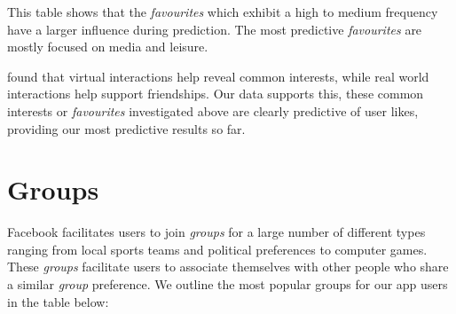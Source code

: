 This table shows that the \emph{favourites} which exhibit a high to medium frequency have a larger influence during prediction. The most 
predictive \emph{favourites} are mostly focused on media and leisure.

\cite{brandtzag2011facebook} found that virtual interactions help reveal common interests, while real world interactions help 
support friendships. Our data supports this, these common interests or \emph{favourites} investigated above are clearly predictive 
of user likes, providing our most predictive results so far.


\section{Groups}
\label{sec:groups}

Facebook facilitates users to join \emph{groups} for a large number of different types ranging from 
local sports teams and political preferences to computer games. These \emph{groups} facilitate users to associate
themselves with other people who share a similar \emph{group} preference. We outline the most popular groups for our app users 
in the table below:


